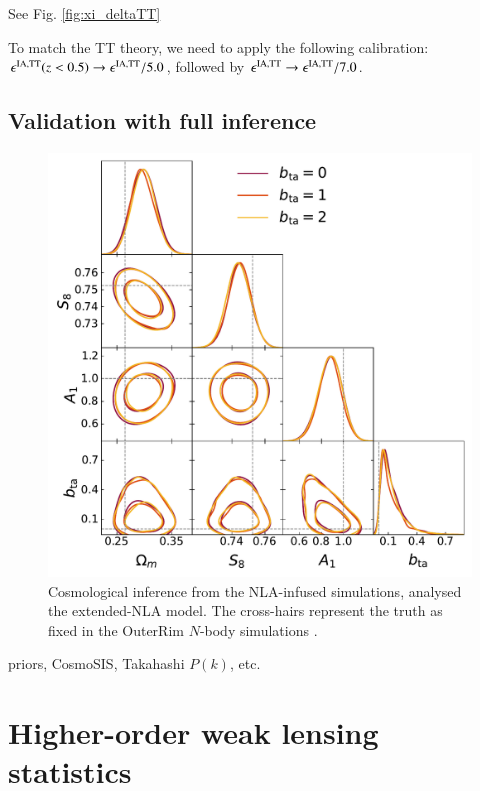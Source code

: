 \documentclass[useAMS,usenatbib]{mn2e}
\begin{document}
See Fig. \ref{fig:xi_deltaTT}

To match the TT theory, we need to apply the following calibration: $\epsilon^{\rm IA, TT}(z<0.5) \rightarrow \epsilon^{\rm IA, TT} /5.0$, followed by $\epsilon^{\rm IA, TT} \rightarrow \epsilon^{\rm IA, TT}/7.0$.



\subsection{Validation with full inference}
 \label{sec:inference}
\begin{figure}
\includegraphics[width=\columnwidth]{graphs/triangle_bta_sweep.pdf}
\caption{Cosmological inference from the NLA-infused simulations, analysed the extended-NLA model. The cross-hairs represent the truth as fixed in the OuterRim $N$-body simulations \citep{OuterRim}.}
\label{fig:triangle_nla}
\end{figure}
priors, {\sc CosmoSIS}, Takahashi $P(k)$, etc.


\section{Higher-order weak lensing statistics}
\label{sec:HOWLS}
\end{document}
